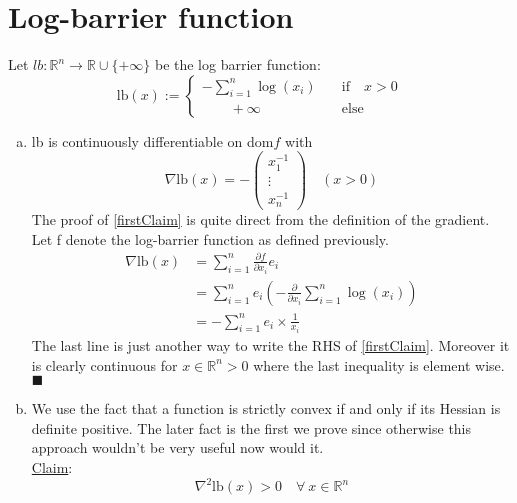 \documentclass{article}
\begin{document}
	\section{Log-barrier function}
	
	Let $lb : \mathbb{R}^n \rightarrow \mathbb R \cup \{+\infty \}$ be the log barrier function:
	\begin{equation*}
		\mathrm{lb}(x) := \begin{cases}
		-\sum_{i=1}^{n} \log (x_i) \quad &\text{if} \quad x>0\\
		\qquad +\infty &\text{else}
		\end{cases}
	\end{equation*}
	\begin{enumerate}[(a)]
		\item lb is continuously differentiable on dom$f$ with
		\begin{equation}\label{firstClaim}
			\nabla \mathrm{lb}(x) = - \begin{pmatrix} x_1^{-1} \\
			\vdots\\
			x_n ^{-1} \end{pmatrix} \quad (x>0)
		\end{equation}
		The proof of \ref{firstClaim} is quite direct from the definition of the gradient. Let f denote the log-barrier function as defined previously.
		\begin{align*}
			\nabla \mathrm{lb}(x) &= \sum_{i=1}^{n} \frac{\partial f}{\partial x_i} e_i\\[2ex]
			&= \sum_{i=1}^{n} e_i \left( - \frac{\partial}{\partial x_i} \sum_{i=1}^{n} \log (x_i) \right)\\[2ex]
			&=  -\sum_{i=1}^{n} e_i \times \frac{1}{x_i}
		\end{align*}
		The last line is just another way to write the RHS of \ref{firstClaim}. Moreover it is clearly continuous for $x\in \mathbb R^n >0$ where the last inequality is element wise. \\
		$\blacksquare$
		\clearpage
		\item We use the fact that a function is strictly convex if and only if its Hessian is definite positive. The later fact is the first we prove since otherwise this approach wouldn't be very useful now would it.\\[2ex]
		\underline{Claim}:
		\begin{equation}\label{claim2}
			\nabla ^2 \mathrm{lb}(x) > 0  \quad \forall \ x \in \mathbb R^n 
		\end{equation} 

\end{enumerate}
\end{document}
